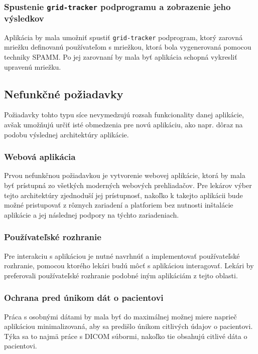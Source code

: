 {\subsubsection {Spustenie \texttt{grid-tracker} podprogramu a zobrazenie jeho výsledkov}\label{grid_results}
Aplikácia by mala umožniť spustiť \texttt{grid-tracker} podprogram, ktorý zarovná mriežku definovanú používateľom s mriežkou, ktorá bola vygenerovaná pomocou techniky SPAMM. Po jej zarovnaní by mala byť aplikácia schopná vykresliť upravenú mriežku.

\subsection {Nefunkčné požiadavky}
Požiadavky tohto typu síce nevymedzujú rozsah funkcionality danej aplikácie, avšak umožňujú určiť isté obmedzenia pre novú aplikáciu, ako napr. dôraz na podobu výslednej architektúry aplikácie.

\subsubsection {Webová aplikácia}

Prvou nefunkčnou požiadavkou je vytvorenie webovej aplikácie, ktorá by mala byť prístupná zo všetkých moderných webových prehliadačov. Pre lekárov výber tejto architektúry zjednoduší jej prístupnosť, nakoľko k takejto aplikácii bude možné pristupovať z rôznych zariadení a platforiem bez nutnosti inštalácie aplikácie a jej následnej podpory na týchto zariadeniach.

\subsubsection {Používateľské rozhranie}

Pre interakciu s aplikáciou je nutné navrhnúť a implementovať používateľské rozhranie, pomocou ktorého lekári budú môcť s aplikáciou interagovať. Lekári by preferovali používateľské rozhranie podobné iným aplikáciám z tejto oblasti.

\subsubsection {Ochrana pred únikom dát o pacientovi}

Práca s osobnými dátami by mala byť do maximálnej možnej miere naprieč aplikáciou minimalizovaná, aby sa predišlo únikom citlivých údajov o pacientovi. Týka sa to najmä práce s DICOM súbormi, nakoľko tie obsahujú citlivé dáta o pacientovi.

}
